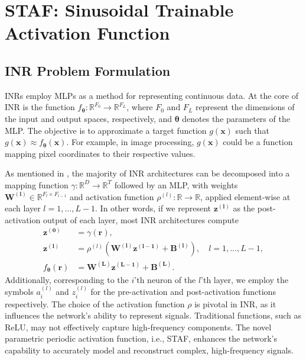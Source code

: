 \section{STAF: Sinusoidal Trainable Activation Function}

\subsection{INR Problem Formulation}
INRs employ MLPs as a method for representing continuous data. At the core of INR is the function $ f_{\boldsymbol{\theta}}: \mathbb{R}^{F_0} \rightarrow \mathbb{R}^{F_L} $, where $ F_0 $ and $ F_L $ represent the dimensions of the input and output spaces, respectively, and $ \boldsymbol{\theta} $ denotes the parameters of the MLP. The objective is to approximate a target function $ g(\boldsymbol{x}) $ such that $ g(\boldsymbol{x}) \approx f_{\boldsymbol{\theta}}(\boldsymbol{x}) $. For example, in image processing, $ g(\boldsymbol{x}) $ could be a function mapping pixel coordinates to their respective values.

As mentioned in \citep{yuce2022structured}, the majority of INR architectures can be decomposed into a mapping function $\gamma:\mathbb{R}^D \rightarrow \mathbb{R}^T$ followed by an MLP, with weights $\boldsymbol{W^{(l)}} \in \mathbb{R}^{F_l\times F_{l-1}}$ and activation function  $\rho^{(l)}: \mathbb{R}\rightarrow \mathbb{R}$, applied element-wise at each layer $l = 1,\ldots,L-1$. In other words, if we represent $\boldsymbol{z^{(l)}}$ as the post-activation output of each layer, most INR architectures compute
\begin{align} \label{Network}
\boldsymbol{z^{(0)}} &= \gamma(\boldsymbol{r}), \nonumber\\
\boldsymbol{z^{(l)}} &= \rho^{(l)}(\boldsymbol{W^{(l)}}\boldsymbol{z^{(l-1)}}+\boldsymbol{B^{(l)}}), \quad l= 1,..., L- 1, \\
f_{\boldsymbol{\theta}}(\boldsymbol{r}) &= \boldsymbol{W^{(L)}}\boldsymbol{z^{(L-1)}}+\boldsymbol{B^{(L)}}. \nonumber
\end{align} 
Additionally, corresponding to the $i$'th neuron of the $l$'th layer, we employ the symbols $a^{(l)}_i$ and $z^{(l)}_i$ for the pre-activation and post-activation functions respectively. The choice of the activation function $ \rho $ is pivotal in INR, as it influences the network's ability to represent signals. Traditional functions, such as ReLU, may not effectively capture high-frequency components. The novel parametric periodic activation function, i.e., STAF, enhances the network's capability to accurately model and reconstruct complex, high-frequency signals.


